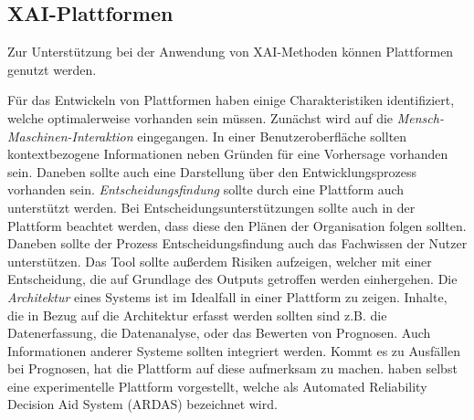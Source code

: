 \subsection{XAI-Plattformen}
Zur Unterstützung bei der Anwendung von XAI-Methoden können Plattformen genutzt werden.

Für das Entwickeln von Plattformen haben \cite{rajabiyazdi2020machine} einige Charakteristiken identifiziert, welche optimalerweise vorhanden sein müssen. Zunächst wird auf die \emph{Mensch-Maschinen-Interaktion} eingegangen. In einer Benutzeroberfläche sollten kontextbezogene Informationen neben Gründen für eine Vorhersage vorhanden sein. Daneben sollte auch eine Darstellung über den Entwicklungsprozess vorhanden sein. \emph{Entscheidungsfindung} sollte durch eine Plattform auch unterstützt werden. Bei Entscheidungsunterstützungen sollte auch in der Plattform beachtet werden, dass diese den Plänen der Organisation folgen sollten. Daneben sollte der Prozess Entscheidungsfindung auch das Fachwissen der Nutzer unterstützen. Das Tool sollte außerdem Risiken aufzeigen, welcher mit einer Entscheidung, die auf Grundlage des Outputs getroffen werden einhergehen. Die \emph{Architektur} eines Systems ist im Idealfall in einer Plattform zu zeigen. Inhalte, die in Bezug auf die Architektur erfasst werden sollten sind z.B. die Datenerfassung, die Datenanalyse, oder das Bewerten von Prognosen. Auch Informationen anderer Systeme sollten integriert werden. Kommt es zu Ausfällen bei Prognosen, hat die Plattform auf diese aufmerksam zu machen. \cite{rajabiyazdi2020machine} haben selbst eine experimentelle Plattform vorgestellt, welche als Automated Reliability Decision Aid System (ARDAS) bezeichnet wird.

